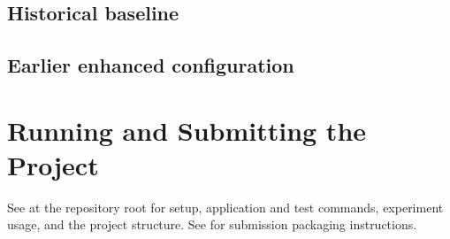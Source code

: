 \documentclass[oneside,final]{hcmut-report}
\begin{document}
\subsection{Historical baseline}

\subsection{Earlier enhanced configuration}


\section{Running and Submitting the Project}
See  at the repository root for setup, application and test
commands, experiment usage, and the project structure. See
 for submission packaging instructions.
\end{document}
